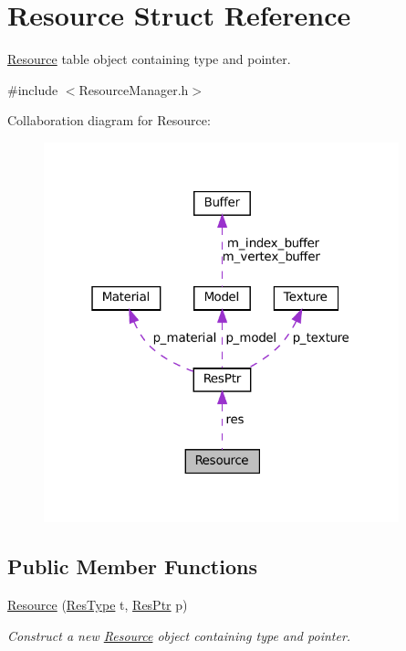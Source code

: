 \hypertarget{structResource}{}\section{Resource Struct Reference}
\label{structResource}


\hyperlink{structResource}{Resource} table object containing type and pointer.  




{\ttfamily \#include $<$Resource\+Manager.\+h$>$}



Collaboration diagram for Resource\+:
\nopagebreak
\begin{figure}[H]
\begin{center}
\leavevmode
\includegraphics[width=292pt]{structResource__coll__graph}
\end{center}
\end{figure}
\subsection*{Public Member Functions}
\begin{DoxyCompactItemize}
\item 
\hyperlink{structResource_a6fad5982974fff2c2c9110370bc95091}{Resource} (\hyperlink{ResourceManager_8h_af056974bdbbf81e99a9d58e34c88c7fa}{Res\+Type} t, \hyperlink{unionResPtr}{Res\+Ptr} p)
\begin{DoxyCompactList}\small\item\em Construct a new \hyperlink{structResource}{Resource} object containing type and pointer. \end{DoxyCompactList}\end{DoxyCompactItemize}
